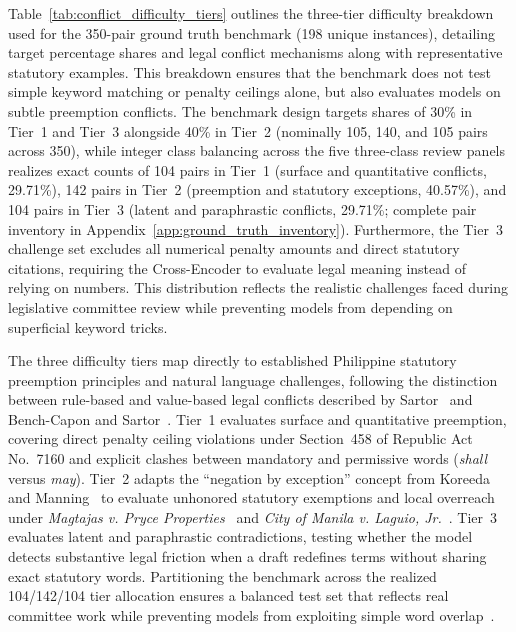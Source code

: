     Table~\ref{tab:conflict_difficulty_tiers} outlines the three-tier difficulty breakdown used for the 350-pair ground truth benchmark (198 unique instances), detailing target percentage shares and legal conflict mechanisms along with representative statutory examples. This breakdown ensures that the benchmark does not test simple keyword matching or penalty ceilings alone, but also evaluates models on subtle preemption conflicts. The benchmark design targets shares of 30\% in Tier~1 and Tier~3 alongside 40\% in Tier~2 (nominally 105, 140, and 105 pairs across 350), while integer class balancing across the five three-class review panels realizes exact counts of 104 pairs in Tier~1 (surface and quantitative conflicts, 29.71\%), 142 pairs in Tier~2 (preemption and statutory exceptions, 40.57\%), and 104 pairs in Tier~3 (latent and paraphrastic conflicts, 29.71\%; complete pair inventory in Appendix~\ref{app:ground_truth_inventory}). Furthermore, the Tier~3 challenge set excludes all numerical penalty amounts and direct statutory citations, requiring the Cross-Encoder to evaluate legal meaning instead of relying on numbers. This distribution reflects the realistic challenges faced during legislative committee review while preventing models from depending on superficial keyword tricks.

    The three difficulty tiers map directly to established Philippine statutory preemption principles and natural language challenges, following the distinction between rule-based and value-based legal conflicts described by Sartor~\cite{sartor2005legal} and Bench-Capon and Sartor~\cite{benchcapon2003theory}. Tier~1 evaluates surface and quantitative preemption, covering direct penalty ceiling violations under Section~458 of Republic Act No.~7160 and explicit clashes between mandatory and permissive words (\textit{shall} versus \textit{may}). Tier~2 adapts the ``negation by exception'' concept from Koreeda and Manning~\cite{koreeda2021contract} to evaluate unhonored statutory exemptions and local overreach under \textit{Magtajas v. Pryce Properties}~\cite{scp1994magtajasvpryce} and \textit{City of Manila v. Laguio, Jr.}~\cite{scp2005manilavlaguio}. Tier~3 evaluates latent and paraphrastic contradictions, testing whether the model detects substantive legal friction when a draft redefines terms without sharing exact statutory words. Partitioning the benchmark across the realized 104/142/104 tier allocation ensures a balanced test set that reflects real committee work while preventing models from exploiting simple word overlap~\cite{mccoy2019right}.

